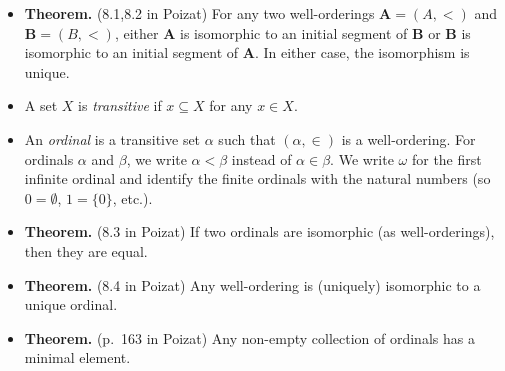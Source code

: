 \documentclass{amsart}
\theoremstyle{definition}
\newcommand{\bA}{\mathbf{A}}
\newcommand{\bB}{\mathbf{B}}
\begin{document}
\begin{itemize}
\item \textbf{Theorem.} (8.1,8.2 in Poizat) For any two well-orderings $\bA = (A, <)$ and $\bB = (B, <)$, either $\bA$ is isomorphic to an initial segment of $\bB$ or $\bB$ is isomorphic to an initial segment of $\bA$. In either case, the isomorphism is unique.

\item A set $X$ is \emph{transitive} if $x \subseteq X$ for any $x \in X$.
\item An \emph{ordinal} is a transitive set $\alpha$ such that $(\alpha, \in)$ is a well-ordering. For ordinals $\alpha$ and $\beta$, we write $\alpha < \beta$ instead of $\alpha \in \beta$. We write $\omega$ for the first infinite ordinal and identify the finite ordinals with the natural numbers (so $0 = \emptyset$, $1 = \{0\}$, etc.).
\item \textbf{Theorem.} (8.3 in Poizat) If two ordinals are isomorphic (as well-orderings), then they are equal.
\item \textbf{Theorem.} (8.4 in Poizat) Any well-ordering is (uniquely) isomorphic to a unique ordinal.
\item \textbf{Theorem.} (p.~163 in Poizat) Any non-empty collection of ordinals has a minimal element.


\end{itemize}
\end{document}

